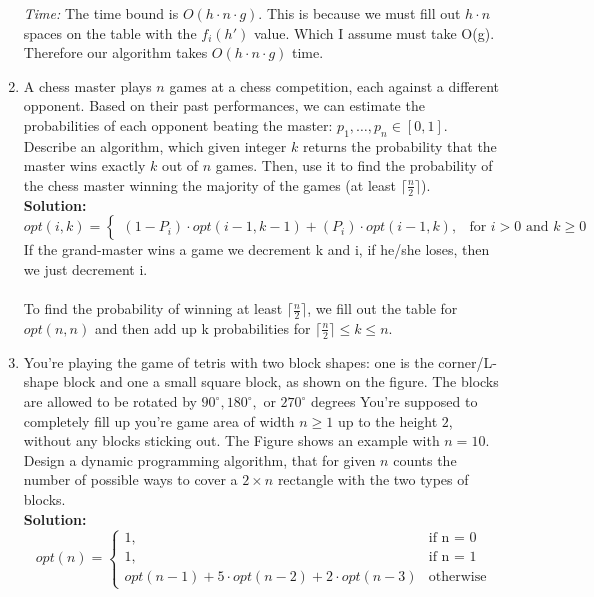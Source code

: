\documentclass[11pt]{article}
\begin{document}
\begin{enumerate}
\textit{Time:} The time bound is $O(h \cdot n \cdot g)$. This is because we must fill out $h \cdot n$ spaces on the table with the $f_i(h')$ value. Which I assume must take O(g). Therefore our algorithm takes $O(h\cdot n \cdot g)$ time. 
\item
A chess master plays $n$ games at a chess competition, each
against a different opponent. Based on their past performances, we can
estimate the probabilities of each opponent beating the master:
$p_1,\ldots,p_n\in [0,1]$. Describe an algorithm, which given integer
$k$ returns the probability that the master wins exactly $k$ out of
$n$ games. Then, use it to find the probability of the chess master
winning the majority of the games (at least $\lceil\frac{n}{2}\rceil$).\\
\textbf{Solution:}\\
\begin{equation}
opt(i, k)=\begin{cases}
(1-P_i) \cdot opt(i-1, k-1) + (P_i) \cdot opt(i-1, k), & \text{for $i > 0$ and $k \geq 0$}
\end{cases}
\end{equation}
If the grand-master wins a game we decrement k and i, if he/she loses, then we just decrement i.\\
\vspace*{3cm}\\
To find the probability of winning at least $\lceil \frac{n}{2} \rceil$, we fill out the table for $opt(n, n)$ and then add up k probabilities for $\lceil \frac{n}{2} \rceil \leq k \leq n$.
\item
You're playing the game of tetris with two block shapes: one is the
corner/L-shape block and one a small square block, as shown on the
figure. The blocks are allowed to be rotated by $90^\circ, 180^\circ,$
or $270^\circ$ degrees  You're supposed to completely fill up you're
game area of width $n\geq 1$ up to the height $2$, without any blocks
sticking out. The Figure shows an example with $n=10$. Design a
dynamic programming algorithm, that for given $n$ counts the number of
possible ways to cover a $2\times n$ rectangle with the two types of blocks.\\
\textbf{Solution:}\\
\begin{equation}
opt(n)=\begin{cases}
1, & \text{if n = 0}\\
1, & \text{if n = 1}\\
opt(n-1) + 5 \cdot opt(n-2) + 2 \cdot opt(n-3) & \text{otherwise}

\end{cases}
\end{equation}
\end{enumerate}
\end{document}
